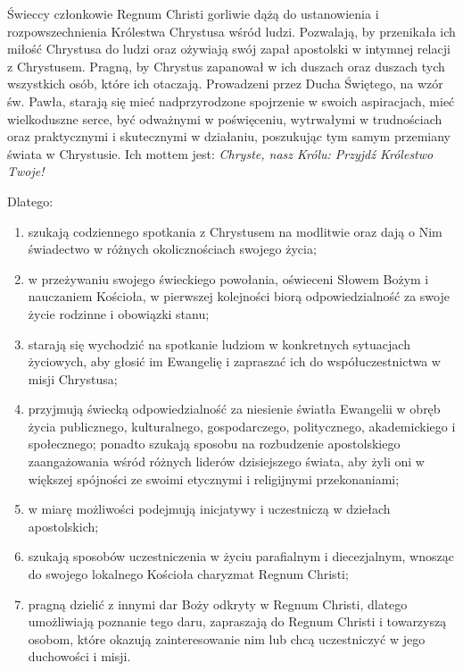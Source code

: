 
 Świeccy członkowie Regnum Christi gorliwie dążą do ustanowienia i rozpowszechnienia Królestwa Chrystusa wśród ludzi. Pozwalają, by przenikała ich miłość Chrystusa do ludzi oraz ożywiają swój zapał apostolski w intymnej relacji z Chrystusem. Pragną, by Chrystus zapanował w ich duszach oraz duszach tych wszystkich osób, które ich otaczają. Prowadzeni przez Ducha Świętego, na wzór św. Pawła, starają się mieć nadprzyrodzone spojrzenie w swoich aspiracjach, mieć wielkoduszne serce, być odważnymi w poświęceniu, wytrwałymi w trudnościach oraz praktycznymi i skutecznymi w działaniu, poszukując tym samym przemiany świata w Chrystusie. Ich mottem jest: {\em Chryste, nasz Królu: Przyjdź Królestwo Twoje!} 

Dlatego:
\begin{enumerate}
	
	\item szukają codziennego spotkania z Chrystusem na modlitwie oraz dają o Nim świadectwo w różnych okolicznościach swojego życia;
	
	\item w przeżywaniu swojego świeckiego powołania, oświeceni Słowem Bożym i nauczaniem Kościoła, w pierwszej kolejności biorą odpowiedzialność za swoje życie rodzinne i obowiązki stanu;
	
	\item starają się wychodzić na spotkanie ludziom w konkretnych sytuacjach życiowych, aby głosić im Ewangelię i zapraszać ich do współuczestnictwa w misji Chrystusa;
	
	\item przyjmują świecką odpowiedzialność za niesienie światła Ewangelii w obręb życia publicznego, kulturalnego, gospodarczego, politycznego, akademickiego i społecznego; ponadto szukają sposobu na rozbudzenie apostolskiego zaangażowania wśród różnych liderów dzisiejszego świata, aby żyli oni w większej spójności ze swoimi etycznymi i religijnymi przekonaniami;
	
	\item w miarę możliwości podejmują inicjatywy i uczestniczą w dziełach apostolskich;
	
	\item szukają sposobów uczestniczenia w życiu parafialnym i diecezjalnym, wnosząc do swojego lokalnego Kościoła charyzmat Regnum Christi;
	
	\item pragną dzielić z innymi dar Boży odkryty w Regnum Christi, dlatego umożliwiają poznanie tego daru, zapraszają do Regnum Christi i towarzyszą osobom, które okazują zainteresowanie nim lub chcą uczestniczyć w jego duchowości i misji.
\end{enumerate}

